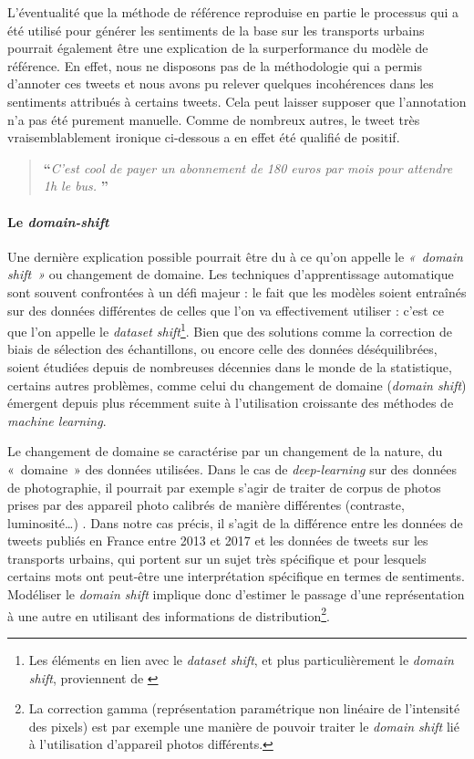 \documentclass[11pt,french,french]{article}
\let\rmarkdownfootnote\footnote%
\def\footnote{\protect\rmarkdownfootnote}
\begin{document}
L'éventualité que la méthode de référence reproduise en partie le
processus qui a été utilisé pour générer les sentiments de la base sur
les transports urbains pourrait également être une explication de la
surperformance du modèle de référence. En effet, nous ne disposons pas
de la méthodologie qui a permis d'annoter ces tweets et nous avons pu
relever quelques incohérences dans les sentiments attribués à certains
tweets. Cela peut laisser supposer que l'annotation n'a pas été purement
manuelle. Comme de nombreux autres, le tweet très vraisemblablement
ironique ci-dessous a en effet été qualifié de positif.

\begin{quote}
\LARGE \textbf{``}\normalsize \emph{C'est cool de payer un abonnement de 180 euros par mois pour attendre 1h le bus.} \LARGE \textbf{''}\normalsize
\end{quote}

\paragraph{\texorpdfstring{Le
\emph{domain-shift}}{Le domain-shift}}\label{le-domain-shift}

Une dernière explication possible pourrait être du à ce qu'on appelle le
\emph{« domain shift »} ou changement de domaine. Les techniques
d'apprentissage automatique sont souvent confrontées à un défi majeur :
le fait que les modèles soient entraînés sur des données différentes de
celles que l'on va effectivement utiliser : c'est ce que l'on appelle le
\emph{dataset shift}\footnote{Les éléments en lien avec le \emph{dataset shift}, et plus particulièrement le \emph{domain shift}, proviennent de \cite{Candela}}.
Bien que des solutions comme la correction de biais de sélection des
échantillons, ou encore celle des données déséquilibrées, soient
étudiées depuis de nombreuses décennies dans le monde de la statistique,
certains autres problèmes, comme celui du changement de domaine
(\emph{domain shift}) émergent depuis plus récemment suite à
l'utilisation croissante des méthodes de \emph{machine learning}.

Le changement de domaine se caractérise par un changement de la nature,
du «~domaine~» des données utilisées. Dans le cas de
\emph{deep-learning} sur des données de photographie, il pourrait par
exemple s'agir de traiter de corpus de photos prises par des appareil
photo calibrés de manière différentes (contraste, luminosité\dots) .
Dans notre cas précis, il s'agit de la différence entre les données de
tweets publiés en France entre 2013 et 2017 et les données de tweets sur
les transports urbains, qui portent sur un sujet très spécifique et pour
lesquels certains mots ont peut-être une interprétation spécifique en
termes de sentiments. Modéliser le \emph{domain shift} implique donc
d'estimer le passage d'une représentation à une autre en utilisant des
informations de distribution\footnote{La correction gamma
  (représentation paramétrique non linéaire de l'intensité des pixels)
  est par exemple une manière de pouvoir traiter le \emph{domain shift}
  lié à l'utilisation d'appareil photos différents.}.
\end{document}
